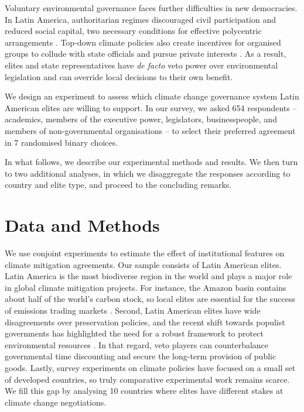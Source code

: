 \documentclass[a4paper,12pt]{article}
\begin{document}
Voluntary environmental governance faces further difficulties in new democracies. In Latin America, authoritarian regimes discouraged civil participation and reduced social capital, two necessary conditions for effective polycentric arrangements \citep{aligica2014institutional,ostrom1990governing}. Top-down climate policies also create incentives for organised groups to collude with state officials and pursue private interests \citep{aklin2013understanding,aklin2014blames}. As a result, elites and state representatives have \textit{de facto} veto power over environmental legislation and can override local decisions to their own benefit.

We design an experiment to assess which climate change governance system Latin American elites are willing to support. In our survey, we asked 654 respondents -- academics, members of the executive power, legislators, businesspeople, and members of non-governmental organisations -- to select their preferred agreement in 7 randomised binary choices.

In what follows, we describe our experimental methods and results. We then turn to two additional analyses, in which we disaggregate the responses according to country and elite type, and proceed to the concluding remarks.

\section{Data and Methods}%
\label{sec:data_and_methods}

We use conjoint experiments to estimate the effect of institutional features on climate mitigation agreements. Our sample consists of Latin American elites. Latin America is the most biodiverse region in the world and plays a major role in global climate mitigation projects. For instance, the Amazon basin contains about half of the world's carbon stock, so local elites are essential for the success of emissions trading markets \citep{benitez2006site, yang2018post}. Second, Latin American elites have wide disagreements over preservation policies, and the recent shift towards populist governments has highlighted the need for a robust framework to protect environmental resources \citep{ellner2019pinktide, lyall2019speculative, sagarzazu2019foreign}. In that regard, veto players can counterbalance governmental time discounting and secure the long-term provision of public goods. Lastly, survey experiments on climate policies have focused on a small set of developed countries, so truly comparative experimental work remains scarce. We fill this gap by analysing 10 countries where elites have different stakes at climate change negotiations.  
\end{document}
